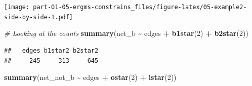 \documentclass[
]{book}
\newenvironment{Shaded}{\begin{snugshade}}{\end{snugshade}}
\newcommand{\AttributeTok}[1]{\textcolor[rgb]{0.13,0.29,0.53}{#1}}
\newcommand{\CommentTok}[1]{\textcolor[rgb]{0.56,0.35,0.01}{\textit{#1}}}
\newcommand{\DecValTok}[1]{\textcolor[rgb]{0.00,0.00,0.81}{#1}}
\newcommand{\FunctionTok}[1]{\textcolor[rgb]{0.13,0.29,0.53}{\textbf{#1}}}
\newcommand{\NormalTok}[1]{#1}
\newcommand{\OtherTok}[1]{\textcolor[rgb]{0.56,0.35,0.01}{#1}}
\newcommand{\SpecialCharTok}[1]{\textcolor[rgb]{0.81,0.36,0.00}{\textbf{#1}}}
\begin{document}
\begin{Shaded}
\end{Shaded}

\texttt{[image: part-01-05-ergms-constrains\_files/figure-latex/05-example2-side-by-side-1.pdf]}

\begin{Shaded}
\begin{Highlighting}[]
\CommentTok{\# Looking at the counts}
\FunctionTok{summary}\NormalTok{(net\_b }\SpecialCharTok{\textasciitilde{}}\NormalTok{ edges }\SpecialCharTok{+} \FunctionTok{b1star}\NormalTok{(}\DecValTok{2}\NormalTok{) }\SpecialCharTok{+} \FunctionTok{b2star}\NormalTok{(}\DecValTok{2}\NormalTok{))}
\end{Highlighting}
\end{Shaded}

\begin{verbatim}
##   edges b1star2 b2star2 
##     245     313     645
\end{verbatim}

\begin{Shaded}
\begin{Highlighting}[]
\FunctionTok{summary}\NormalTok{(net\_not\_b }\SpecialCharTok{\textasciitilde{}}\NormalTok{ edges }\SpecialCharTok{+} \FunctionTok{ostar}\NormalTok{(}\DecValTok{2}\NormalTok{) }\SpecialCharTok{+} \FunctionTok{istar}\NormalTok{(}\DecValTok{2}\NormalTok{))}
\end{Highlighting}
\end{Shaded}
\end{document}
